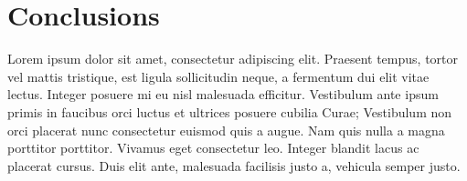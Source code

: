 \documentclass[paper=a4,fontsize=11pt,twocolumn]{article}
\begin{document}
\section{Conclusions}
Lorem ipsum dolor sit amet, consectetur adipiscing elit. Praesent tempus, tortor vel mattis tristique, est ligula sollicitudin neque, a fermentum dui elit vitae lectus. Integer posuere mi eu nisl malesuada efficitur. Vestibulum ante ipsum primis in faucibus orci luctus et ultrices posuere cubilia Curae; Vestibulum non orci placerat nunc consectetur euismod quis a augue. Nam quis nulla a magna porttitor porttitor. Vivamus eget consectetur leo. Integer blandit lacus ac placerat cursus. Duis elit ante, malesuada facilisis justo a, vehicula semper justo.





\end{document}
